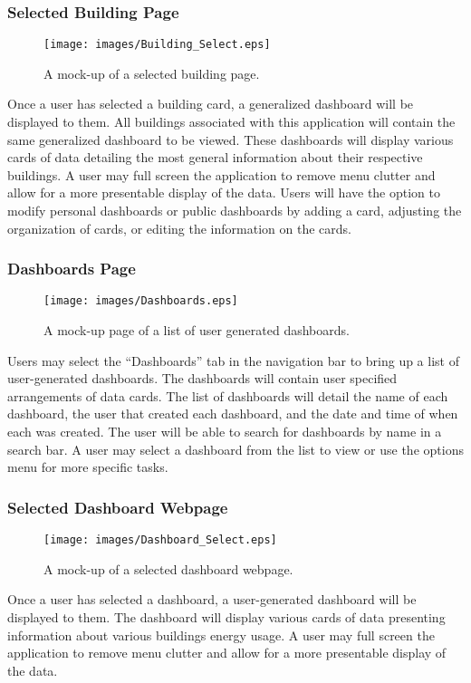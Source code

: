 \documentclass[journal,10pt,onecolumn,compsoc]{IEEEtran}
\begin{document}
    \subsubsection{Selected Building Page}
    \begin{figure}[H]
        \centering
        \texttt{[image: images/Building\_Select.eps]}
        \caption{A mock-up of a selected building page.}
    \end{figure}
	Once a user has selected a building card, a generalized dashboard will be displayed to them.
	All buildings associated with this application will contain the same generalized dashboard to be viewed.
	These dashboards will display various cards of data detailing the most general information about their respective buildings.
	A user may full screen the application to remove menu clutter and allow for a more presentable display of the data. 
	Users will have the option to modify personal dashboards or public dashboards by adding a card, adjusting the organization of cards, or editing the information on the cards.
	
	\subsubsection{Dashboards Page}
    \begin{figure}[H]
        \centering
        \texttt{[image: images/Dashboards.eps]}
        \caption{A mock-up page of a list of user generated dashboards.}
    \end{figure}
	Users may select the ``Dashboards'' tab in the navigation bar to bring up a list of user-generated dashboards.
	The dashboards will contain user specified arrangements of data cards. 
	The list of dashboards will detail the name of each dashboard, the user that created each dashboard, and the date and time of when each was created.
	The user will be able to search for dashboards by name in a search bar. 
	A user may select a dashboard from the list to view or use the options menu for more specific tasks.
	
    \subsubsection{Selected Dashboard Webpage}
    \begin{figure}[H]
        \centering
        \texttt{[image: images/Dashboard\_Select.eps]}
        \caption{A mock-up of a selected dashboard webpage.}
    \end{figure}
	Once a user has selected a dashboard, a user-generated dashboard will be displayed to them.
	The dashboard will display various cards of data presenting information about various buildings energy usage.
	A user may full screen the application to remove menu clutter and allow for a more presentable display of the data.
	
\end{document}
